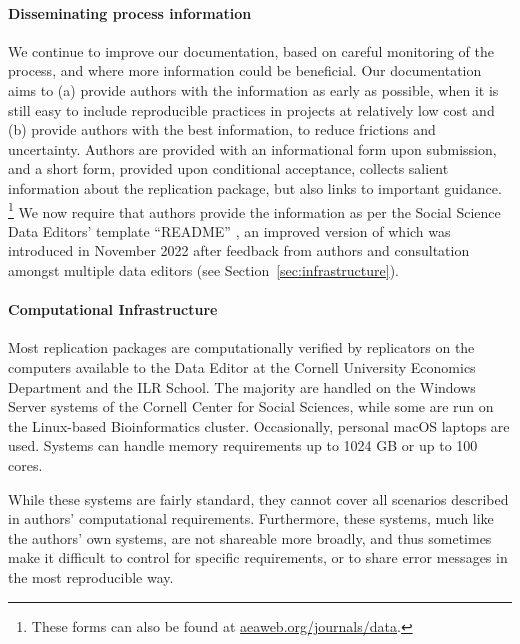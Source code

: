 \paragraph{Disseminating process information}

We continue to improve our documentation, based on careful monitoring of the process, and where more information could be beneficial. Our documentation aims to (a) provide authors with the information as early as possible, when it is still easy to include reproducible practices in projects at relatively low cost and (b) provide authors with the best information, to reduce frictions and uncertainty. Authors are provided with an informational form upon submission, and a short form, provided upon conditional acceptance, collects salient information about the replication package, but also links to important guidance.%
\footnote{These forms can also be found at \href{https://www.aeaweb.org/journals/data}{aeaweb.org/journals/data}.} 
We now require that authors provide the information as per the Social Science Data Editors' template ``README'' \citep{READMEv1.1.0}, an improved version of which  was introduced in November 2022 after feedback from authors and consultation amongst multiple data editors (see Section~\ref{sec:infrastructure}). 

\paragraph{Computational Infrastructure}

Most replication packages are computationally verified by replicators on the computers available to the Data Editor at the Cornell University Economics Department and the ILR School. The majority are handled on the Windows Server systems of the Cornell Center for Social Sciences, while some are run on the Linux-based Bioinformatics cluster. Occasionally, personal macOS laptops are used. Systems can handle memory requirements up to 1024 GB or up to 100 cores. 

While these systems are fairly standard, they cannot cover all scenarios described in authors' computational requirements. Furthermore, these systems, much like the authors' own systems, are not shareable more broadly, and thus sometimes make it difficult to control for specific requirements, or to share error messages in the most reproducible way.  

